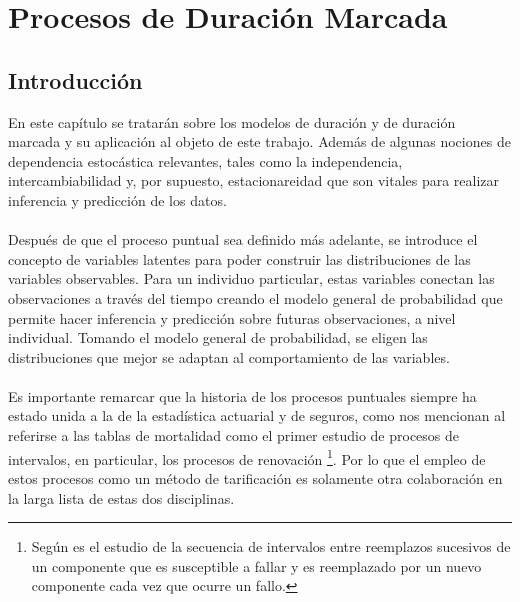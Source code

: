 \chapter{Procesos de Duraci\'on Marcada}
\section{Introducci\'on}
En este cap\'itulo se tratar\'an sobre los modelos de duraci\'on y de duraci\'on marcada y su aplicaci\'on al objeto de este trabajo. Adem\'as de algunas nociones de dependencia estoc\'astica relevantes, tales como la independencia, intercambiabilidad y, por supuesto, estacionareidad que son vitales para realizar inferencia y predicci\'on de los datos.\\
\\
Despu\'es de que el proceso puntual sea definido m\'as adelante, se introduce el concepto de variables latentes para poder construir las distribuciones de las variables observables. Para un individuo particular, estas variables conectan las observaciones a trav\'es del tiempo creando el modelo general de probabilidad que permite hacer inferencia y predicci\'on sobre futuras observaciones, a nivel individual. Tomando el modelo general de probabilidad, se eligen las distribuciones que mejor se adaptan al comportamiento de las variables.\\
\\
Es importante remarcar que la historia de los procesos puntuales siempre ha estado unida a la de la estad\'istica actuarial y de seguros, como nos mencionan \cite{daley2003} al referirse a las tablas de mortalidad como el primer estudio de procesos de intervalos, en particular, los procesos de renovaci\'on \footnote{Seg\'un \cite{daley2003} es el estudio de la secuencia de intervalos entre reemplazos sucesivos de un componente que es susceptible a fallar y es reemplazado por un nuevo componente cada vez que ocurre un fallo.}. Por lo que el empleo de estos procesos como un m\'etodo de tarificaci\'on es solamente otra colaboraci\'on en la larga lista de estas dos disciplinas.
\\
